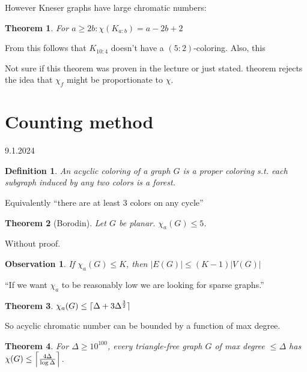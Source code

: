 \documentclass{article}
\newtheorem*{theorem}{Theorem}
\newtheorem*{definition}{Definition}
\newtheorem*{observation}{Observation}
\begin{document}
\noindent
However Kneser graphs have large chromatic numbers:

\begin{theorem}
	For $a \ge 2b: \chi(K_{a:b}) = a - 2b + 2$
\end{theorem}

\noindent
From this follows that $K_{10:4}$ doesn't have a $(5:2)$-coloring. Also, this

\noindent
Not sure if this theorem was proven in the lecture or just stated.
theorem rejects the idea that $\chi_f$ might be proportionate to $\chi$.


\newpage
\section{Counting method} %
9.1.2024

\begin{definition}
	An \emph{acyclic coloring} of a graph $G$ is a proper coloring s.t.
	each subgraph induced by any two colors is a forest.
\end{definition}

\noindent
Equivalently \enquote{there are at least $3$ colors on any cycle}

\begin{theorem}[Borodin]
	Let $G$ be planar. $\chi_a(G) \le 5$.
\end{theorem}

\noindent
Without proof.

\begin{observation}
	If $\chi_a(G) \le K$, then $|E(G)| \le (K-1)|V(G)|$
\end{observation}

\noindent
\enquote{If we want $\chi_a$ to be reasonably low we are looking for sparse
graphs.}

\begin{theorem}
	$\chi_a(G) \le \lceil \Delta + 3 \Delta^{3 \over 2} \rceil$
\end{theorem}

\noindent
So acyclic chromatic number can be bounded by a function of max degree.

\begin{theorem}
	For $\Delta \ge 10^{100}$, every triangle-free graph $G$ of max degree
	$\le \Delta$ has $\chi(G) \le \left \lceil {{4\Delta} \over
	{\log{\Delta}}} \right \rceil$.
\end{theorem}
\end{document}
